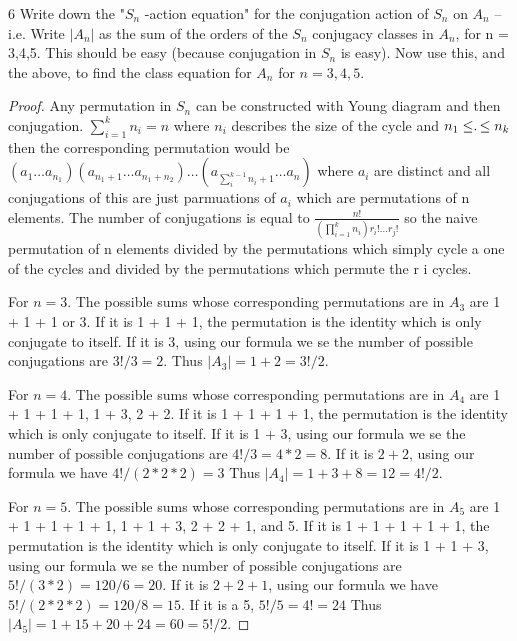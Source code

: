 \documentclass{article}
\begin{document}
\bigskip

\begin{PROB}{6}\label{Problem 6.}
    Write down the "$S_n$ -action equation" for the conjugation action of $S_n$ on $A_n$ -- i.e. Write $|A_n|$ as the sum of the orders of the $S_n$ conjugacy classes in $A_n$, for n = 3,4,5.  This should be easy (because conjugation in $S_n$ is easy).  Now use this, and the above, to find the class equation for $A_n$ for $n= 3 , 4 , 5$.
\end{PROB}
\begin{proof}
    Any permutation in $S_n$ can be constructed with Young diagram and then conjugation. $\sum_{i = 1}^{k} n_i = n$ where $n_i$ describes the size of the cycle and $n_1 \leq \ldotp \leq n_k$ then the corresponding permutation would be $(a_1 \ldots a_{n_1})(a_{n_1 + 1} \ldots a_{n_1 + n_2}) \ldots (a_{\sum_{i}^{k-1}n_i + 1} \ldots a_{n})$ where $a_i$ are distinct and all conjugations of this are just parmuations of $a_i$ which are permutations of n elements. The number of conjugations is equal to $\frac{n!}{(\prod_{i = 1}^k n_i)r_i!\ldots r_j!}$ so the naive permutation of n elements divided by the permutations which simply cycle a one of the cycles and divided by the permutations which permute the r i cycles.

    For $n = 3$. The possible sums whose corresponding permutations are in $A_3$ are 1 + 1 + 1 or 3. If it is 1 + 1 + 1, the permutation is the identity which is only conjugate to itself. If it is 3, using our formula we se the number of possible conjugations are $3!/3 = 2$. Thus $|A_3| = 1 + 2 = 3!/2$. 

    For $n = 4$. The possible sums whose corresponding permutations are in $A_4$ are 1 + 1 + 1 + 1, 1 + 3, 2 + 2. If it is 1 + 1 + 1 + 1, the permutation is the identity which is only conjugate to itself. If it is 1 + 3, using our formula we se the number of possible conjugations are $4!/3 = 4 * 2 = 8$. If it is $2 + 2$, using our formula we have $4!/(2 * 2 * 2) = 3$ Thus $|A_4| = 1 + 3 + 8 = 12 = 4!/2$.

    For $n = 5$. The possible sums whose corresponding permutations are in $A_5$ are 1 + 1 + 1 + 1 + 1, 1 + 1 + 3, 2 + 2 + 1, and 5. If it is 1 + 1 + 1 + 1 + 1, the permutation is the identity which is only conjugate to itself. If it is 1 + 1 + 3, using our formula we se the number of possible conjugations are $5!/(3 * 2) = 120/6 = 20$. If it is $2 + 2 + 1$, using our formula we have $5!/(2 * 2 * 2) = 120/8 = 15$. If it is a 5, $5!/5 = 4! = 24$ Thus $|A_5| = 1 + 15 + 20 + 24 = 60 = 5!/2$.



\end{proof}
\end{document}
